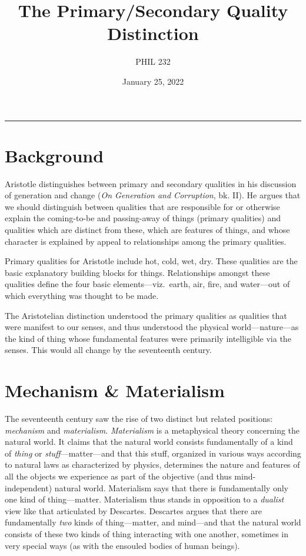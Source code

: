 \documentclass[12pt]{article}
\author{PHIL 232}
\date{January 25, 2022}
\title{The Primary/Secondary Quality Distinction}
\begin{document}
\maketitle
\tableofcontents

\noindent\rule{\textwidth}{0.5pt}

\section{Background}
\label{sec:orgbe42928}
Aristotle distinguishes between primary and secondary qualities in his
discussion of generation and change (\emph{On Generation and Corruption}, bk.
II). He argues that we should distinguish between qualities that are
responsible for or otherwise explain the coming-to-be and passing-away
of things (primary qualities) and qualities which are distinct from
these, which are features of things, and whose character is explained by
appeal to relationships among the primary qualities.

Primary qualities for Aristotle include hot, cold, wet, dry. These
qualities are the basic explanatory building blocks for things.
Relationships amongst these qualities define the four basic
elements---viz. earth, air, fire, and water---out of which everything
was thought to be made.

The Aristotelian distinction understood the primary qualities as
qualities that were manifest to our senses, and thus understood the
physical world---nature---as the kind of thing whose fundamental
features were primarily intelligible via the senses. This would all
change by the seventeenth century.

\section{Mechanism \& Materialism}
\label{sec:org9bd3549}
The seventeenth century saw the rise of two distinct but related
positions: \emph{mechanism} and \emph{materialism}. \emph{Materialism} is a
metaphysical theory concerning the natural world. It claims that the
natural world consists fundamentally of a kind of \emph{thing} or \emph{stuff}---matter---and
that this stuff, organized in various ways according to natural laws as
characterized by physics, determines the nature and features of all the
objects we experience as part of the objective (and thus
mind-independent) natural world. Materialism says that there is
fundamentally only one kind of thing---matter. Materialism thus stands
in opposition to a \emph{dualist} view like that articulated by Descartes.
Descartes argues that there are fundamentally \emph{two} kinds of
thing---matter, and mind---and that the natural world consists of these
two kinds of thing interacting with one another, sometimes in very
special ways (as with the ensouled bodies of human beings).
\end{document}
